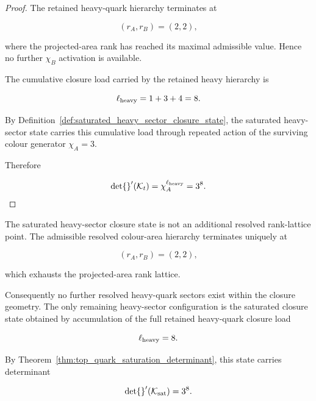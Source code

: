 \documentclass[11pt]{article}
\theoremstyle{definition}
\theoremstyle{remark}
\begin{document}
\begin{proof}

The retained heavy-quark hierarchy terminates at

\begin{equation}
(r_A,r_B)=(2,2),
\end{equation}

where the projected-area rank has reached its maximal
admissible value. Hence no further \(\chi_B\) activation is
available.

The cumulative closure load carried by the retained heavy
hierarchy is

\begin{equation}
\ell_{\rm heavy}
=
1+3+4
=
8.
\end{equation}

By Definition~\ref{def:saturated_heavy_sector_closure_state},
the saturated heavy-sector state carries this cumulative load
through repeated action of the surviving colour generator
\(\chi_A=3\).

Therefore

\begin{equation}
\det{}'(\mathcal K_t)
=
\chi_A^{\ell_{\rm heavy}}
=
3^8.
\end{equation}

\end{proof}

The saturated heavy-sector closure state is not an additional
resolved rank-lattice point. The admissible resolved
colour-area hierarchy terminates uniquely at

\begin{equation}
(r_A,r_B)=(2,2),
\end{equation}

which exhausts the projected-area rank lattice.

Consequently no further resolved heavy-quark sectors exist
within the closure geometry. The only remaining heavy-sector
configuration is the saturated closure state obtained by
accumulation of the full retained heavy-quark closure load

\begin{equation}
\ell_{\rm heavy}=8.
\end{equation}

By Theorem~\ref{thm:top_quark_saturation_determinant}, this
state carries determinant

\begin{equation}
\det{}'(\mathcal K_{\rm sat})
=
3^8.
\end{equation}
\end{document}
